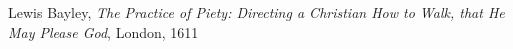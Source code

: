 \begin{thebibliography}{9}

        Lewis Bayley,
        \textit{The Practice of Piety: Directing a Christian How to Walk, that He May Please God},
        London,
        1611

\end{thebibliography}